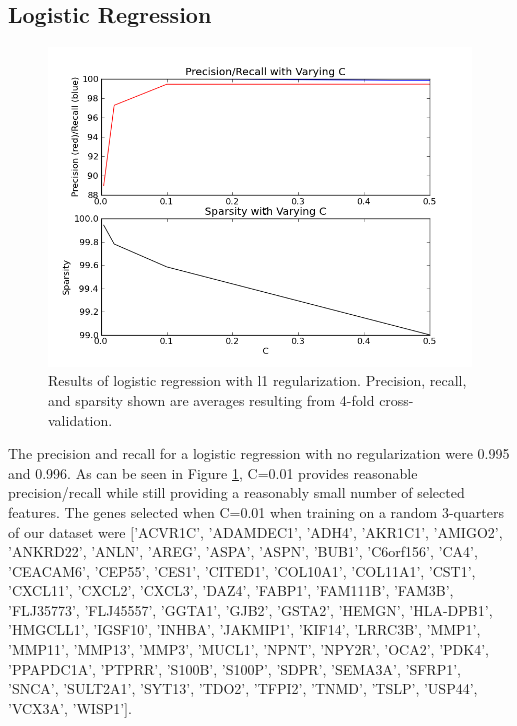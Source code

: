 \documentclass[11pt]{article}
\begin{document}
\subsection{Logistic Regression}

\begin{figure}[h!]
  \centering
    \includegraphics[scale=0.3]{sparselog.png}
  \caption{Results of logistic regression with l1 regularization. Precision, recall, and sparsity shown are averages resulting from 4-fold cross-validation.}
\label{fig:sparselog}
\end{figure}

The precision and recall for a logistic regression with no regularization were 0.995 and 0.996. As can be seen in Figure \ref{fig:sparselog}, C=0.01 provides reasonable precision/recall while still providing a reasonably small number of selected features. The genes selected when C=0.01 when training on a random 3-quarters of our dataset were $[$'ACVR1C', 'ADAMDEC1', 'ADH4', 'AKR1C1', 'AMIGO2', 'ANKRD22', 'ANLN', 'AREG', 'ASPA', 'ASPN', 'BUB1', 'C6orf156', 'CA4', 'CEACAM6', 'CEP55', 'CES1', 'CITED1', 'COL10A1', 'COL11A1', 'CST1', 'CXCL11', 'CXCL2', 'CXCL3', 'DAZ4', 'FABP1', 'FAM111B', 'FAM3B', 'FLJ35773', 'FLJ45557', 'GGTA1', 'GJB2', 'GSTA2', 'HEMGN', 'HLA-DPB1', 'HMGCLL1', 'IGSF10', 'INHBA', 'JAKMIP1', 'KIF14', 'LRRC3B', 'MMP1', 'MMP11', 'MMP13', 'MMP3', 'MUCL1', 'NPNT', 'NPY2R', 'OCA2', 'PDK4', 'PPAPDC1A', 'PTPRR', 'S100B', 'S100P', 'SDPR', 'SEMA3A', 'SFRP1', 'SNCA', 'SULT2A1', 'SYT13', 'TDO2', 'TFPI2', 'TNMD', 'TSLP', 'USP44', 'VCX3A', 'WISP1'$]$.
\end{document}
